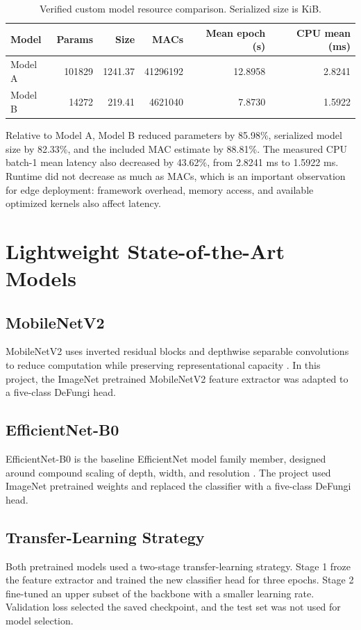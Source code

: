 \documentclass[11pt,a4paper]{article}
\begin{document}
\begin{table}[H]
\centering
\caption{Verified custom model resource comparison. Serialized size is KiB.}
\label{tab:custom_resources}
\begin{tabular}{lrrrrr}
\toprule
Model & Params & Size & MACs & Mean epoch (s) & CPU mean (ms) \\
\midrule
Model A & 101829 & 1241.37 & 41296192 & 12.8958 & 2.8241 \\
Model B & 14272 & 219.41 & 4621040 & 7.8730 & 1.5922 \\
\bottomrule
\end{tabular}
\end{table}

Relative to Model A, Model B reduced parameters by 85.98\%, serialized model size by 82.33\%, and the included MAC estimate by 88.81\%. The measured CPU batch-1 mean latency also decreased by 43.62\%, from 2.8241 ms to 1.5922 ms. Runtime did not decrease as much as MACs, which is an important observation for edge deployment: framework overhead, memory access, and available optimized kernels also affect latency.

\section{Lightweight State-of-the-Art Models}
\subsection{MobileNetV2}
MobileNetV2 uses inverted residual blocks and depthwise separable convolutions to reduce computation while preserving representational capacity \cite{sandler2018mobilenetv2}. In this project, the ImageNet pretrained MobileNetV2 feature extractor was adapted to a five-class DeFungi head.

\subsection{EfficientNet-B0}
EfficientNet-B0 is the baseline EfficientNet model family member, designed around compound scaling of depth, width, and resolution \cite{tan2019efficientnet}. The project used ImageNet pretrained weights and replaced the classifier with a five-class DeFungi head.

\subsection{Transfer-Learning Strategy}
Both pretrained models used a two-stage transfer-learning strategy. Stage 1 froze the feature extractor and trained the new classifier head for three epochs. Stage 2 fine-tuned an upper subset of the backbone with a smaller learning rate. Validation loss selected the saved checkpoint, and the test set was not used for model selection.
\end{document}

